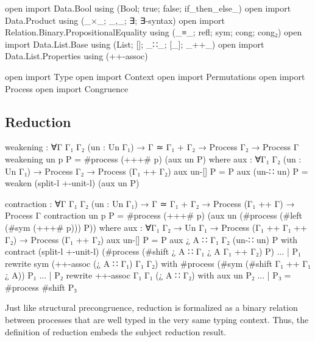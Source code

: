 \begin{code}[hide]
open import Data.Bool using (Bool; true; false; if_then_else_)
open import Data.Product using (_×_; _,_; ∃; ∃-syntax)
open import Relation.Binary.PropositionalEquality using (_≡_; refl; sym; cong; cong₂)
open import Data.List.Base using (List; []; _∷_; [_]; _++_)
open import Data.List.Properties using (++-assoc)

open import Type
open import Context
open import Permutations
open import Process
open import Congruence
\end{code}

\subsection{Reduction}
\label{sec:reduction-agda}

\begin{code}[hide]
weakening : ∀{Γ Γ₁ Γ₂} (un : Un Γ₁) → Γ ≃ Γ₁ + Γ₂ → Process Γ₂ → Process Γ
weakening un p P = #process (+++# p) (aux un P)
  where
    aux : ∀{Γ₁ Γ₂} (un : Un Γ₁) → Process Γ₂ → Process (Γ₁ ++ Γ₂)
    aux un-[] P = P
    aux (un-∷ un) P = weaken (split-l +-unit-l) (aux un P)

contraction : ∀{Γ Γ₁ Γ₂} (un : Un Γ₁) → Γ ≃ Γ₁ + Γ₂ → Process (Γ₁ ++ Γ) → Process Γ
contraction un p P = #process (+++# p) (aux un (#process (#left (#sym (+++# p))) P))
  where
    aux : ∀{Γ₁ Γ₂} → Un Γ₁ → Process (Γ₁ ++ Γ₁ ++ Γ₂) → Process (Γ₁ ++ Γ₂)
    aux un-[] P = P
    aux {¿ A ∷ Γ₁} {Γ₂} (un-∷ un) P with contract (split-l +-unit-l) (#process (#shift {¿ A ∷ Γ₁} {¿ A} {Γ₁ ++ Γ₂}) P)
    ... | P₁ rewrite sym (++-assoc (¿ A ∷ Γ₁) Γ₁ Γ₂) with #process (#sym (#shift {Γ₁ ++ Γ₁} {¿ A})) P₁
    ... | P₂ rewrite ++-assoc Γ₁ Γ₁ (¿ A ∷ Γ₂) with aux un P₂
    ... | P₃ = #process #shift P₃
\end{code}

Just like structural precongruence, reduction is formalized as a binary relation
between processes that are well typed in the very same typing context. Thus, the
definition of reduction embeds the subject reduction result.

